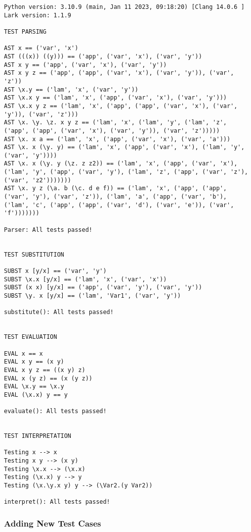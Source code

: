 \begin{verbatim}
Python version: 3.10.9 (main, Jan 11 2023, 09:18:20) [Clang 14.0.6 ]
Lark version: 1.1.9

TEST PARSING

AST x == ('var', 'x')
AST (((x)) ((y))) == ('app', ('var', 'x'), ('var', 'y'))
AST x y == ('app', ('var', 'x'), ('var', 'y'))
AST x y z == ('app', ('app', ('var', 'x'), ('var', 'y')), ('var', 'z'))
AST \x.y == ('lam', 'x', ('var', 'y'))
AST \x.x y == ('lam', 'x', ('app', ('var', 'x'), ('var', 'y')))
AST \x.x y z == ('lam', 'x', ('app', ('app', ('var', 'x'), ('var', 'y')), ('var', 'z')))
AST \x. \y. \z. x y z == ('lam', 'x', ('lam', 'y', ('lam', 'z', ('app', ('app', ('var', 'x'), ('var', 'y')), ('var', 'z')))))
AST \x. x a == ('lam', 'x', ('app', ('var', 'x'), ('var', 'a')))
AST \x. x (\y. y) == ('lam', 'x', ('app', ('var', 'x'), ('lam', 'y', ('var', 'y'))))
AST \x. x (\y. y (\z. z z2)) == ('lam', 'x', ('app', ('var', 'x'), ('lam', 'y', ('app', ('var', 'y'), ('lam', 'z', ('app', ('var', 'z'), ('var', 'z2')))))))
AST \x. y z (\a. b (\c. d e f)) == ('lam', 'x', ('app', ('app', ('var', 'y'), ('var', 'z')), ('lam', 'a', ('app', ('var', 'b'), ('lam', 'c', ('app', ('app', ('var', 'd'), ('var', 'e')), ('var', 'f')))))))

Parser: All tests passed!


TEST SUBSTITUTION

SUBST x [y/x] == ('var', 'y')
SUBST \x.x [y/x] == ('lam', 'x', ('var', 'x'))
SUBST (x x) [y/x] == ('app', ('var', 'y'), ('var', 'y'))
SUBST \y. x [y/x] == ('lam', 'Var1', ('var', 'y'))

substitute(): All tests passed!


TEST EVALUATION

EVAL x == x
EVAL x y == (x y)
EVAL x y z == ((x y) z)
EVAL x (y z) == (x (y z))
EVAL \x.y == \x.y
EVAL (\x.x) y == y

evaluate(): All tests passed!


TEST INTERPRETATION

Testing x --> x
Testing x y --> (x y)
Testing \x.x --> (\x.x)
Testing (\x.x) y --> y
Testing (\x.\y.x y) y --> (\Var2.(y Var2))

interpret(): All tests passed!
\end{verbatim}

\subsubsection{Adding New Test Cases}

